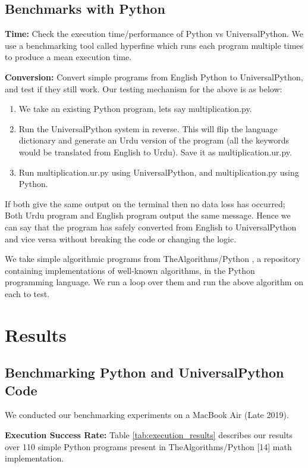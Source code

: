 \documentclass[conference]{IEEEtran}
\begin{document}
\subsection{Benchmarks with Python}\label{BB}

\textbf{Time:} Check the execution time/performance of Python vs UniversalPython. We use a benchmarking tool called hyperfine which runs each program multiple times to produce a mean execution time.

\textbf{Conversion:} Convert simple programs from English Python to UniversalPython, and test if they still work. Our testing mechanism for the above is as below:
\begin{enumerate}
\item We take an existing Python program, lets say multiplication.py.

\item Run the UniversalPython system in reverse. This will flip the language dictionary and generate an Urdu version of the program (all the keywords would be translated from English to Urdu). Save it as multiplication.ur.py.

\item Run multiplication.ur.py using UniversalPython, and multiplication.py using Python.
\end{enumerate}
If both give the same output on the terminal then no data loss has occurred; Both Urdu program and English program output the same message. Hence we can say that the program has safely converted from English to UniversalPython and vice versa without breaking the code or changing the logic.

We take simple algorithmic programs from TheAlgorithms/Python \cite{thealgorithms_python}, a repository containing implementations of well-known algorithms, in the Python programming language. We run a loop over them and run the above algorithm on each to test.

\section{Results}

\subsection{Benchmarking Python and UniversalPython Code}

We conducted our benchmarking experiments on a MacBook Air (Late 2019).

\textbf{Execution Success Rate:} Table \ref{tab:execution_results} describes our results over 110 simple Python programs present in TheAlgorithms/Python [14] math implementation.
\end{document}
